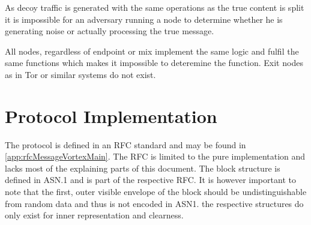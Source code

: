 As decoy traffic is generated with the same operations as the true content is split it is impossible for an adversary running a node to determine whether he is generating noise or actually processing the true message.

All nodes, regardless of endpoint or mix implement the same logic and fulfil the same functions which makes it impossible to deteremine the function. Exit nodes as in Tor or similar systems do not exist.


\section{Protocol Implementation\label{protoImpl}}
The protocol is defined in an RFC standard and may be found in \ref{app:rfcMessageVortexMain}. The RFC is limited to the pure implementation and lacks most of the explaining parts of this document. The block structure is defined in ASN.1 and is part of the respective RFC. It is however important to note that the first, outer visible envelope of the block should be undistinguishable from random data and thus is not encoded in ASN1. the respective structures do only exist for inner representation and clearness.

